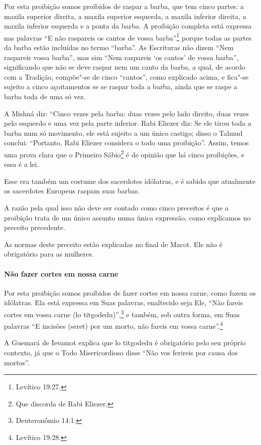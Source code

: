 \begin{multicols}{2}
Por esta proibição somos proibidos de raspar a barba, que tem cinco
partes: a maxila superior direita, a maxila superior esquerda, a maxila
inferior direita, a maxila inferior esquerda e a ponta da barba. A
proibição completa está expressa nas palavras ``E não raspareis os
cantos de vossa barba''\footnote{Levítico 19:27.} porque todas as partes da
barba estão incluídas no termo ``barba''. As Escrituras não dizem ``Nem
raspareis vossa barba'', mas sim ``Nem raspareis `os cantos' de vossa
barba'', significando que não se deve raspar nem um canto da barba, a
qual, de acordo com a Tradição, compõe"-se de cinco ``cantos'', como
explicado acima, e fica"-se sujeito a cinco açoitamentos se se raspar
toda a barba, ainda que se raspe a barba toda de uma só vez.

A Mishná\starr{} diz: ``Cinco vezes pela barba: duas vezes pelo lado direito,
duas vezes pelo esquerdo e uma vez pela parte inferior. Rabi Eliezer\starr{}
diz: Se ele tirou toda a barba num só movimento, ele está sujeito a um
único castigo; disso o Talmud\starr{} conclui: ``Portanto, Rabi Eliezer\starr{}
considera o todo uma proibição''. Assim, temos uma prova clara que o
Primeiro Sábio\footnote{Que discorda de Rabi Eliezer\starr.} é de opinião que há cinco
proibições, e essa é a lei.

Esse era também um costume dos sacerdotes idólatras, e é sabido que
atualmente os sacerdotes Europeus raspam suas barbas.

A razão pela qual isso não deve ser contado como cinco preceitos é que a
proibição trata de um único assunto numa única expressão, como
explicamos no preceito precedente.

As normas deste preceito estão explicadas no final de Macot\starr. Ele não é
obrigatório para as mulheres.

\paragraph{Não fazer cortes em nossa carne}

Por esta proibição somos proibidos de fazer cortes em nossa carne, como
fazem os idólatras. Ela está expressa em Suas palavras, enaltecido seja
Ele, ``Não fareis cortes em vossa carne (lo titgodedu\starr)'',\footnote{Deuteronômio
14:1.} e também, sob outra forma, em Suas palavras ``E incisões (seret\starr)
por um morto, não fareis em vossa carne''.\footnote{Levítico 19:28.}

A Guemará\starr{} de Ievamot\starr{} explica que lo titgodedu\starr{} é obrigatório
pelo seu próprio contexto, já que o Todo Misericordioso disse ``Não vos
ferireis por causa dos mortos''.


\end{multicols}
